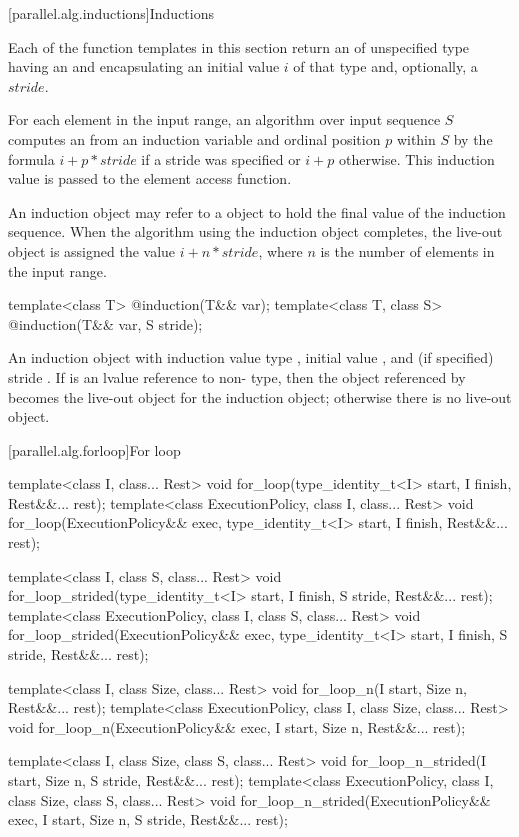 [parallel.alg.inductions]{Inductions}

\pnum
Each of the function templates in this section return an  of unspecified type having an  and encapsulating an initial value $i$ of that type and, optionally, a $stride$.

\pnum
For each element in the input range, an algorithm over input sequence $S$ computes an  from an induction variable and ordinal position $p$ within $S$ by the formula $i + p * stride$ if a stride was specified or $i + p$ otherwise. This induction value is passed to the element access function.

\pnum
An induction object may refer to a  object to hold the final value of the induction sequence. When the algorithm using the induction object completes, the live-out object is assigned the value $i + n * stride$, where $n$ is the number of elements in the input range.

\begin{itemdecl}
template<class T>
  @\unspec@ induction(T&& var);
template<class T, class S>
  @\unspec@ induction(T&& var, S stride);
\end{itemdecl}

\begin{itemdescr}
\pnum
\returns An induction object with induction value type , initial value , and (if specified) stride . If  is an lvalue reference to non- type, then the object referenced by  becomes the live-out object for the induction object; otherwise there is no live-out object.
\end{itemdescr}

[parallel.alg.forloop]{For loop}

\begin{itemdecl}
template<class I, class... Rest>
  void for_loop(type_identity_t<I> start, I finish, Rest&&... rest);
template<class ExecutionPolicy, class I, class... Rest>
  void for_loop(ExecutionPolicy&& exec, type_identity_t<I> start, I finish, Rest&&... rest);

template<class I, class S, class... Rest>
  void for_loop_strided(type_identity_t<I> start, I finish, S stride, Rest&&... rest);
template<class ExecutionPolicy, class I, class S, class... Rest>
  void for_loop_strided(ExecutionPolicy&& exec, type_identity_t<I> start, I finish, S stride,
                        Rest&&... rest);

template<class I, class Size, class... Rest>
  void for_loop_n(I start, Size n, Rest&&... rest);
template<class ExecutionPolicy, class I, class Size, class... Rest>
  void for_loop_n(ExecutionPolicy&& exec, I start, Size n, Rest&&... rest);

template<class I, class Size, class S, class... Rest>
  void for_loop_n_strided(I start, Size n, S stride, Rest&&... rest);
template<class ExecutionPolicy, class I, class Size, class S, class... Rest>
  void for_loop_n_strided(ExecutionPolicy&& exec, I start, Size n, S stride, Rest&&... rest);
\end{itemdecl}

